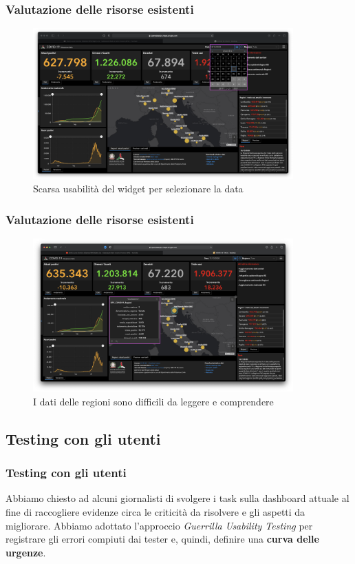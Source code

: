 \documentclass[handout]{beamer}
\begin{document}
			\begin{frame}
				\frametitle{Valutazione delle risorse esistenti}
				\begin{figure}
					\includegraphics[width=10cm]{img/guidelines_violations_8}
					\caption{Scarsa usabilità del widget per selezionare la data}
				\end{figure}
			\end{frame}

			\begin{frame}
				\frametitle{Valutazione delle risorse esistenti}
				\begin{figure}
					\includegraphics[width=10cm]{img/guidelines_violations_10}
					\caption{I dati delle regioni sono difficili da leggere e comprendere}
				\end{figure}
			\end{frame}


		\subsection{Testing con gli utenti}

			\begin{frame}
				\frametitle{Testing con gli utenti}
				Abbiamo chiesto ad alcuni giornalisti di svolgere i task sulla dashboard attuale al fine di raccogliere evidenze circa le criticità da risolvere e gli aspetti da migliorare. \newline \newline
				Abbiamo adottato l'approccio \textit{Guerrilla Usability Testing} per registrare gli errori compiuti dai tester e, quindi, definire una \textbf{curva delle urgenze}.
			\end{frame}
\end{document}
